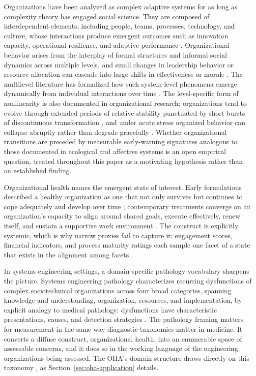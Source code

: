 \documentclass[12pt, letterpaper]{article}
\begin{document}
Organizations have been analyzed as complex adaptive systems for as long as complexity theory has engaged social science. They are composed of interdependent elements, including people, teams, processes, technology, and culture, whose interactions produce emergent outcomes such as innovation capacity, operational resilience, and adaptive performance \parencite{anderson1999,schneider2006}. Organizational behavior arises from the interplay of formal structures and informal social dynamics across multiple levels, and small changes in leadership behavior or resource allocation can cascade into large shifts in effectiveness or morale \parencite{schneider2006}. The multilevel literature has formalized how such system-level phenomena emerge dynamically from individual interactions over time \parencite{kozlowski2000,kozlowski2013}. The level-specific form of nonlinearity is also documented in organizational research: organizations tend to evolve through extended periods of relative stability punctuated by short bursts of discontinuous transformation \parencite{gersick1991,romanelli1994}, and under acute stress organized behavior can collapse abruptly rather than degrade gracefully \parencite{weick1993}. Whether organizational transitions are preceded by measurable early-warning signatures analogous to those documented in ecological and affective systems \parencite{scheffer2009,vandeLeemput2014} is an open empirical question, treated throughout this paper as a motivating hypothesis rather than an established finding.

Organizational health names the emergent state of interest. Early formulations described a healthy organization as one that not only survives but continues to cope adequately and develop over time \parencite{miles1965}; contemporary treatments converge on an organization's capacity to align around shared goals, execute effectively, renew itself, and sustain a supportive work environment \parencite{camp2024,keller2011}. The construct is explicitly systemic, which is why narrow proxies fail to capture it: engagement scores, financial indicators, and process maturity ratings each sample one facet of a state that exists in the alignment among facets \parencite{denison1995,schneider2006}.

In systems engineering settings, a domain-specific pathology vocabulary sharpens the picture. Systems engineering pathology characterizes recurring dysfunctions of complex sociotechnical organizations across four broad categories, spanning knowledge and understanding, organization, resources, and implementation, by explicit analogy to medical pathology: dysfunctions have characteristic presentations, causes, and detection strategies \parencite{davidz2018}. The pathology framing matters for measurement in the same way diagnostic taxonomies matter in medicine. It converts a diffuse construct, organizational health, into an enumerable space of assessable concerns, and it does so in the working language of the engineering organizations being assessed. The OHA's domain structure draws directly on this taxonomy \parencite{carr2025}, as Section~\ref{sec:oha-application} details.
\end{document}
